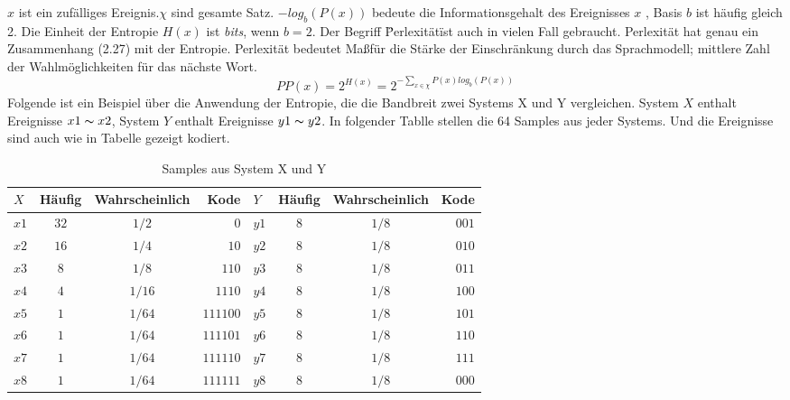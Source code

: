 $x$ ist ein zuf\"alliges Ereignis.$\chi$ sind gesamte Satz. $-log_{b}(P(x))$ bedeute die Informationsgehalt des Ereignisses $x$ , Basis $b$ ist h\"aufig gleich 2. Die Einheit der Entropie $H(x)$ ist \emph{bits}, wenn $b=2$.
Der Begriff \"Perlexit\"at\" ist auch in vielen Fall gebraucht. Perlexit\"at hat genau ein Zusammenhang (2.27) mit der Entropie. Perlexit\"at bedeutet Ma\ss f\"ur die St\"arke der Einschr\"ankung durch das Sprachmodell; mittlere Zahl der Wahlm\"oglichkeiten f\"ur das n\"achste Wort.
\begin{equation}
\label{equation:bewertung_02}
PP(x)=2^{H(x)}=2^{-\sum_{x\in\chi}P(x)log_{b}(P(x))}
\end{equation}
Folgende ist ein Beispiel \"uber die Anwendung der Entropie, die die Bandbreit zwei Systems X und Y vergleichen. System $X$ enthalt Ereignisse $x1\thicksim x2$, System $Y$ enthalt Ereignisse $y1\thicksim y2$. In folgender Tablle stellen die 64 Samples aus jeder Systems. Und die Ereignisse sind auch wie in Tabelle gezeigt kodiert.
\begin{table}[h]
  \begin{center}
    \begin{tabular}{lccrlccr}
      \toprule
      \bf $X$ & \bf H\"aufig & \bf Wahrscheinlich & \bf Kode 
   	& \bf $Y$ & \bf H\"aufig & \bf Wahrscheinlich & \bf Kode\\    
      \midrule     
      $x1$ 		&  $32$ 		 	& $1/2$  							& $0$	
    & $y1$		&  $8$ 		 		& $1/8$  							& $001$	\\
      $x2$ 		&  $16$ 			& $1/4$  							& $10$
    & $y2$		&  $8$ 		 		& $1/8$  							& $010$	\\
     	$x3$ 		&  $8$ 		 		& $1/8$  							& $110$	
    & $y3$		&  $8$ 		 		& $1/8$  							& $011$	\\
      $x4$ 		&  $4$ 				& $1/16$  						& $1110$
    & $y4$		&  $8$ 		 		& $1/8$  							& $100$	\\
     	$x5$ 		&  $1$ 		 		& $1/64$   						& $111100$	
    & $y5$		&  $8$ 		 		& $1/8$  							& $101$	\\
      $x6$ 		&  $1$ 				& $1/64$  						& $111101$
   	& $y6$		&  $8$ 		 		& $1/8$  							& $110$	\\
     	$x7$ 		&  $1$ 		 		& $1/64$  						& $111110$	
    & $y7$		&  $8$ 		 		& $1/8$  							& $111$	\\
      $x8$ 		&  $1$ 				& $1/64$  						& $111111$
    & $y8$		&  $8$ 		 		& $1/8$  							& $000$	\\     
      \bottomrule
    \end{tabular}
  \end{center}
\caption{Samples aus System X und Y}
\label{tab:table_2}
\end{table}

